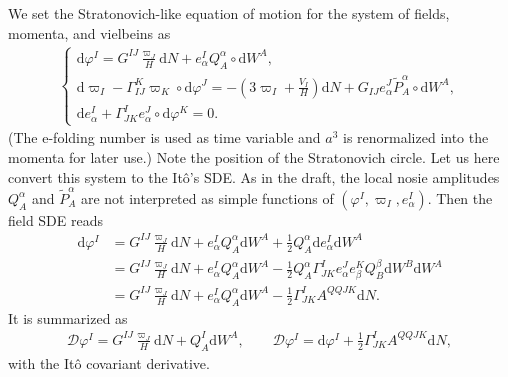 \documentclass[aps, prd
, preprint
, nofootinbib 
, longbibliography
]{revtex4-1}
\newcommand{\dd}{\mathrm{d}}
\newcommand{\dps}{\displaystyle}
\newcommand{\calD}{\mathcal{D}}
\newcommand{\bae}[1]{\begin{align} #1 \end{align}}
\newcommand{\bce}[1]{\begin{cases} #1 \end{cases}}
\begin{document}
We set the Stratonovich-like equation of motion for the system of fields, momenta, and vielbeins as
\bae{
    \bce{
        \dps
        \dd\varphi^I=G^{IJ}\frac{\varpi_J}{H}\dd N+e^I_\alpha Q^\alpha_A\circ\dd W^A, \\
        \dps
        \dd\varpi_I-\Gamma_{IJ}^K\varpi_K\circ\dd\varphi^J=-\left(3\varpi_I+\frac{V_I}{H}\right)\dd N+G_{IJ}e^J_\alpha\tilde{P}^\alpha_A\circ\dd W^A, \\
        \dps
        \dd e^I_\alpha+\Gamma^I_{JK}e^J_\alpha\circ\dd\varphi^K=0.
    }    
}
(The e-folding number is used as time variable and $a^3$ is renormalized into the momenta for later use.)
Note the position of the Stratonovich circle.
Let us here convert this system to the It\^o's SDE. As in the draft, the local nosie amplitudes $Q^\alpha_A$ and $\tilde{P}^\alpha_A$ are not interpreted as simple functions of $(\varphi^I,\varpi_I,e^I_\alpha)$.
Then the field SDE reads
\bae{
    \dd\varphi^I&=G^{IJ}\frac{\varpi_J}{H}\dd N+e^I_\alpha Q^\alpha_A\dd W^A+\frac{1}{2}Q^\alpha_A\dd e^I_\alpha\dd W^A \nonumber \\
    &=G^{IJ}\frac{\varpi_J}{H}\dd N+e^I_\alpha Q^\alpha_A\dd W^A-\frac{1}{2}Q^\alpha_A\Gamma^I_{JK}e^J_\alpha e^K_\beta Q^\beta_B\dd W^B\dd W^A \nonumber \\
    &=G^{IJ}\frac{\varpi_J}{H}\dd N+e^I_\alpha Q^\alpha_A\dd W^A-\frac{1}{2}\Gamma^I_{JK}A^{QQJK}\dd N.
}
It is summarized as
\bae{
    \calD\varphi^I=G^{IJ}\frac{\varpi_J}{H}\dd N+Q^I_A\dd W^A, \qquad \calD\varphi^I=\dd\varphi^I+\frac{1}{2}\Gamma^I_{JK}A^{QQJK}\dd N,
}
with the It\^o covariant derivative.
\end{document}
